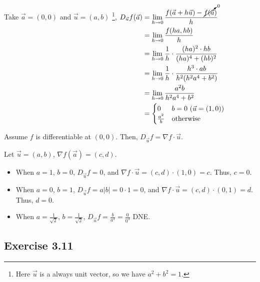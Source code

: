 Take $\vec{a} = (0,0)$ and $\vec{u} = (a,b)$ \footnote{Here $\vec{u}$ is a always unit vector, so we have $a^2 + b^2 = 1$. },
$\begin{aligned}[t]
    D_{\vec{u}} f(\vec{a}) & = \lim_{h\to0} \frac{f(\vec{a} + h\vec{u}) - \cancelto{0}{f(\vec{a}})}{h} \\
                           & = \lim_{h\to0} \frac{f(ha, hb)}{h}                                        \\
                           & = \lim_{h\to0} \frac{1}{h} \cdot \frac{(ha)^2 \cdot hb}{(ha)^4 + (hb)^2}  \\
                           & = \lim_{h\to0} \frac{1}{h} \cdot \frac{h^3 \cdot ab}{h^2(h^2a^4 + b^2)}   \\
                           & = \lim_{h\to0} \frac{a^2b}{h^2a^4 + b^2}                                  \\
                           & = \begin{cases}
                                   0             & b = 0 ~ (\vec{u} = (1,0)) \\
                                   \frac{a^2}{b} & \text{otherwise}
                               \end{cases}
\end{aligned}$

Assume $f$ is differentiable at $(0,0)$. Then, $D_{\vec{u}}f = \nabla f \cdot \vec{u}$. 

Let $\vec{u} = (a,b)$, $\nabla f(\vec{a}) = (c,d)$. 
\begin{itemize}
    \item When $a = 1$, $b = 0$,  $D_{\vec{u}} f = 0$, and $\nabla f \cdot \vec{u} = (c, d) \cdot (1, 0) = c$. Thus, $c = 0$. 
    \item When $a = 0$, $b = 1$,  $D_{\vec{u}} f = a|b| = 0 \cdot 1 = 0$, and $\nabla f \cdot \vec{u} = (c, d) \cdot (0, 1) = d$. Thus, $d = 0$. 
    \item When $a = \frac{1}{\sqrt{2}}$, $b = \frac{1}{\sqrt{2}}$, $D_{\vec{u}} f = \frac{b}{a^3} = \frac{0}{0^3}$ DNE. %
\end{itemize}

\subsection*{Exercise 3.11}

